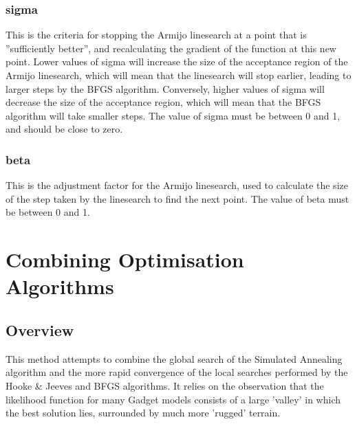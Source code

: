 \documentclass[10pt,twoside]{book}
\begin{document}
\subsubsection{sigma}
This is the criteria for stopping the Armijo linesearch at a point that is ''sufficiently better'', and recalculating the gradient of the function at this new point.  Lower values of sigma will increase the size of the acceptance region of the Armijo linesearch, which will mean that the linesearch will stop earlier, leading to larger steps by the BFGS algorithm.  Conversely, higher values of sigma will decrease the size of the acceptance region, which will mean that the BFGS algorithm will take smaller steps.  The value of sigma must be between 0 and 1, and should be close to zero.

\subsubsection{beta}
This is the adjustment factor for the Armijo linesearch, used to calculate the size of the step taken by the linesearch to find the next point.  The value of beta must be between 0 and 1.


\section{Combining Optimisation Algorithms}\label{sec:combine}
\subsection{Overview}\label{subsec:combineover}
This method attempts to combine the global search of the Simulated Annealing algorithm and the more rapid convergence of the local searches performed by the Hooke \& Jeeves and BFGS algorithms.  It relies on the observation that the likelihood function for many Gadget models consists of a large 'valley' in which the best solution lies, surrounded by much more 'rugged' terrain.
\end{document}
